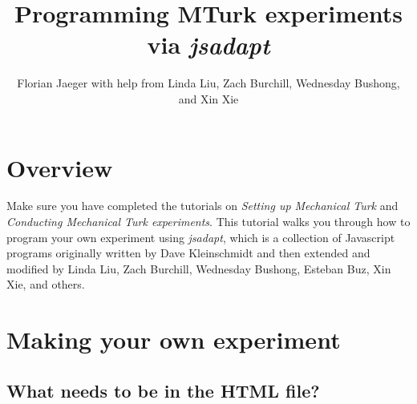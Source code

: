 \documentclass{article}
\title{Programming MTurk experiments via {\em jsadapt}}
\author{Florian Jaeger with help from Linda Liu, Zach Burchill, Wednesday Bushong, and Xin Xie}
\begin{document}
\maketitle

\tableofcontents 

\section{Overview}

Make sure you have completed the tutorials on {\em Setting up Mechanical Turk} and {\em Conducting Mechanical Turk experiments}. This tutorial walks you through how to program your own experiment using {\em jsadapt}, which is a collection of Javascript programs originally written by Dave Kleinschmidt and then extended and modified by Linda Liu, Zach Burchill, Wednesday Bushong, Esteban Buz, Xin Xie, and others.




\section{Making your own experiment}


\subsection{What needs to be in the HTML file?}
\end{document}

